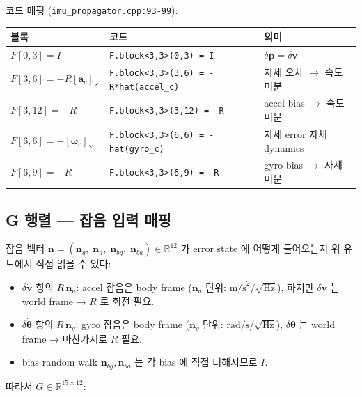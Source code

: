 \documentclass[11pt,a4paper,oneside]{report}
\newcommand{\R}{\mathbb{R}}
\begin{document}
코드 매핑 (\texttt{imu\_propagator.cpp:93-99}):
\begin{center}\small
\begin{tabular}{lll}
\toprule
블록 & 코드 & 의미 \\
\midrule
\(F[0,3]=I\)             & \texttt{F.block<3,3>(0,3)  = I}                   & \(\dot{\delta\bm{p}}=\delta\bm{v}\) \\
\(F[3,6]=-R[\bm{a}_c]_\times\) & \texttt{F.block<3,3>(3,6)  = -R*hat(accel\_c)}    & 자세 오차 \(\to\) 속도 미분 \\
\(F[3,12]=-R\)           & \texttt{F.block<3,3>(3,12) = -R}                  & accel bias \(\to\) 속도 미분 \\
\(F[6,6]=-[\bm{\omega}_c]_\times\) & \texttt{F.block<3,3>(6,6)  = -hat(gyro\_c)}  & 자세 error 자체 dynamics \\
\(F[6,9]=-R\)            & \texttt{F.block<3,3>(6,9)  = -R}                  & gyro bias \(\to\) 자세 미분 \\
\bottomrule
\end{tabular}
\end{center}

\subsection{G 행렬 — 잡음 입력 매핑}

잡음 벡터 \(\bm{n} = (\bm{n}_g,\;\bm{n}_a,\;\bm{n}_{bg},\;\bm{n}_{ba}) \in \R^{12}\) 가 error state 에 어떻게 들어오는지 위 유도에서 직접 읽을 수 있다:

\begin{itemize}
\item \(\delta\dot{\bm{v}}\) 항의 \(R\,\bm{n}_a\): accel 잡음은 body frame (\(\bm{n}_a\) 단위: \(\text{m/s}^2/\sqrt{\text{Hz}}\)), 하지만 \(\delta\bm{v}\) 는 world frame → \(R\) 로 회전 필요.
\item \(\delta\dot{\bm{\theta}}\) 항의 \(R\,\bm{n}_g\): gyro 잡음은 body frame (\(\bm{n}_g\) 단위: \(\text{rad/s}/\sqrt{\text{Hz}}\)), \(\delta\bm{\theta}\) 는 world frame → 마찬가지로 \(R\) 필요.
\item bias random walk \(\bm{n}_{bg},\bm{n}_{ba}\) 는 각 bias 에 직접 더해지므로 \(I\).
\end{itemize}

따라서 \(G \in \R^{15 \times 12}\):
\end{document}

